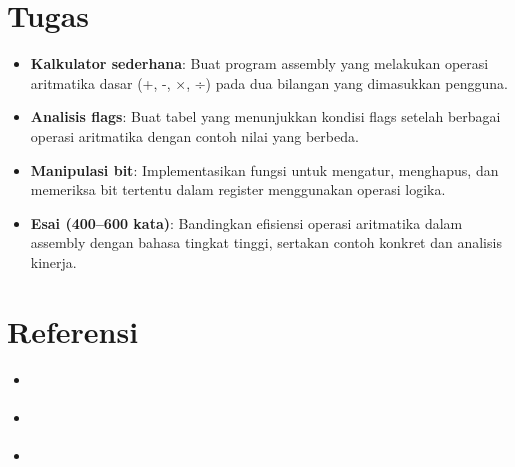 \documentclass[../main.tex]{subfiles}
\begin{document}
\section{Tugas}\label{sec:instruksi-dasar-tugas}
\begin{itemize}
    \item \textbf{Kalkulator sederhana}: Buat program assembly yang melakukan operasi aritmatika dasar (+, -, ×, ÷) pada dua bilangan yang dimasukkan pengguna.
    \item \textbf{Analisis flags}: Buat tabel yang menunjukkan kondisi flags setelah berbagai operasi aritmatika dengan contoh nilai yang berbeda.
    \item \textbf{Manipulasi bit}: Implementasikan fungsi untuk mengatur, menghapus, dan memeriksa bit tertentu dalam register menggunakan operasi logika.
    \item \textbf{Esai (400--600 kata)}: Bandingkan efisiensi operasi aritmatika dalam assembly dengan bahasa tingkat tinggi, sertakan contoh konkret dan analisis kinerja.
\end{itemize}

\section{Referensi}\label{sec:instruksi-dasar-referensi}
\begin{itemize}
    \item \cite{hyde2010art}
    \item \cite{nopi2003tutorial}
    \item \cite{intel2019manual32}
\end{itemize}
\end{document}
